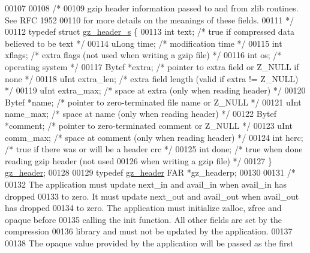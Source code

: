 \begin{DoxyCode}
00107 
00108 \textcolor{comment}{/*}
00109 \textcolor{comment}{     gzip header information passed to and from zlib routines.  See RFC 1952}
00110 \textcolor{comment}{  for more details on the meanings of these fields.}
00111 \textcolor{comment}{*/}
00112 \textcolor{keyword}{typedef} \textcolor{keyword}{struct }\hyperlink{structgz__header__s}{gz\_header\_s} \{
00113     \textcolor{keywordtype}{int}     text;       \textcolor{comment}{/* true if compressed data believed to be text */}
00114     uLong   time;       \textcolor{comment}{/* modification time */}
00115     \textcolor{keywordtype}{int}     xflags;     \textcolor{comment}{/* extra flags (not used when writing a gzip file) */}
00116     \textcolor{keywordtype}{int}     os;         \textcolor{comment}{/* operating system */}
00117     Bytef   *extra;     \textcolor{comment}{/* pointer to extra field or Z\_NULL if none */}
00118     uInt    extra\_len;  \textcolor{comment}{/* extra field length (valid if extra != Z\_NULL) */}
00119     uInt    extra\_max;  \textcolor{comment}{/* space at extra (only when reading header) */}
00120     Bytef   *name;      \textcolor{comment}{/* pointer to zero-terminated file name or Z\_NULL */}
00121     uInt    name\_max;   \textcolor{comment}{/* space at name (only when reading header) */}
00122     Bytef   *comment;   \textcolor{comment}{/* pointer to zero-terminated comment or Z\_NULL */}
00123     uInt    comm\_max;   \textcolor{comment}{/* space at comment (only when reading header) */}
00124     \textcolor{keywordtype}{int}     hcrc;       \textcolor{comment}{/* true if there was or will be a header crc */}
00125     \textcolor{keywordtype}{int}     done;       \textcolor{comment}{/* true when done reading gzip header (not used}
00126 \textcolor{comment}{                           when writing a gzip file) */}
00127 \} \hyperlink{structgz__header__s}{gz\_header};
00128 
00129 \textcolor{keyword}{typedef} \hyperlink{structgz__header__s}{gz\_header} FAR *gz\_headerp;
00130 
00131 \textcolor{comment}{/*}
00132 \textcolor{comment}{     The application must update next\_in and avail\_in when avail\_in has dropped}
00133 \textcolor{comment}{   to zero.  It must update next\_out and avail\_out when avail\_out has dropped}
00134 \textcolor{comment}{   to zero.  The application must initialize zalloc, zfree and opaque before}
00135 \textcolor{comment}{   calling the init function.  All other fields are set by the compression}
00136 \textcolor{comment}{   library and must not be updated by the application.}
00137 \textcolor{comment}{}
00138 \textcolor{comment}{     The opaque value provided by the application will be passed as the first}

\end{DoxyCode}
